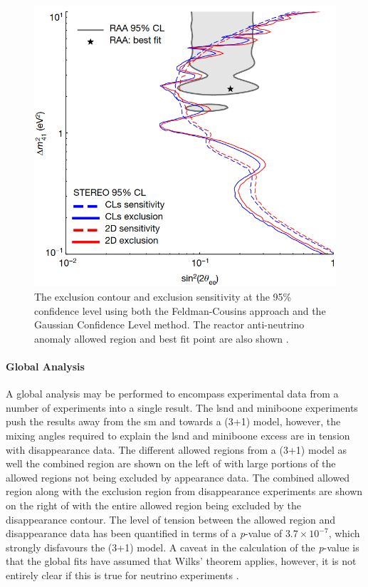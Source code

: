 \begin{figure}[h!]
    \centering
    \includegraphics[width = \mediumfigwidth]{figures-chap2/stereo.png}
    \caption[\gls{stereo} exclusion sensitivity at the 95\% confidence level.]{The exclusion contour and exclusion sensitivity at the 95\% confidence level using both the Feldman-Cousins approach and the Gaussian Confidence Level method. The reactor anti-neutrino anomaly allowed region and best fit point are also shown \cite{STEREO}.}
    \label{fig:stereo_exclusion_contour}
\end{figure}

\newpage
\paragraph{Global Analysis}
A global analysis may be performed to encompass experimental data from a number of experiments into a single result. The \gls{lsnd} and \gls{miniboone} experiments push the results away from the \gls{sm} and towards a (3+1) model, however, the mixing angles required to explain the \gls{lsnd} and \gls{miniboone} excess are in tension with \numu disappearance data. The different allowed regions from a (3+1) model as well the combined region are shown on the left of  with large portions of the allowed regions not being excluded by appearance data. The combined allowed region along with the exclusion region from disappearance experiments are shown on the right of  with the entire allowed region being excluded by the disappearance contour. The level of tension between the allowed region and disappearance data has been quantified in terms of a \textit{p}-value of $3.7 \times 10^{-7}$, which strongly disfavours the (3+1) model. A caveat in the calculation of the \textit{p}-value is that the global fits have assumed that Wilks' theorem applies, however, it is not entirely clear if this is true for neutrino experiments \cite{wilks_theorem}\cite{snowmass_2021}. 

